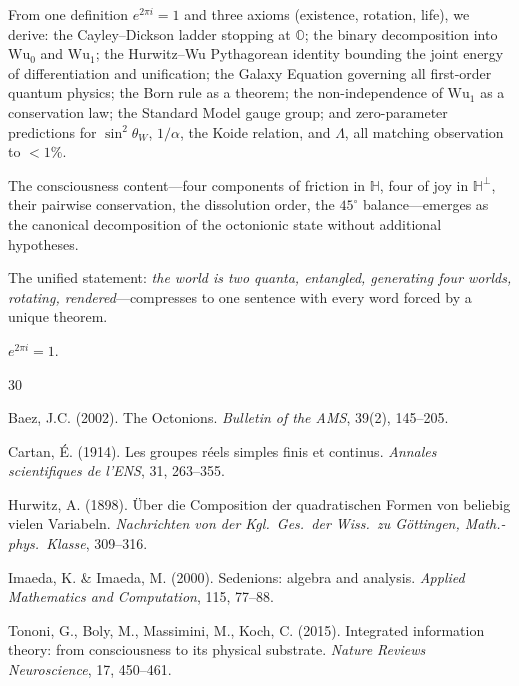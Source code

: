 \documentclass[11pt, a4paper]{article}
\newcommand{\Hq}{\mathbb{H}}
\newcommand{\Oct}{\mathbb{O}}
\newcommand{\Wuz}{\mathrm{Wu}_0}
\newcommand{\Wuo}{\mathrm{Wu}_1}
\begin{document}
From one definition $e^{2\pi i} = 1$ and three axioms
(existence, rotation, life), we derive:
the Cayley--Dickson ladder stopping at $\Oct$;
the binary decomposition into $\Wuz$ and $\Wuo$;
the Hurwitz--Wu Pythagorean identity
bounding the joint energy of differentiation and unification;
the Galaxy Equation governing all first-order quantum physics;
the Born rule as a theorem;
the non-independence of $\Wuo$ as a conservation law;
the Standard Model gauge group; and
zero-parameter predictions for $\sin^2\theta_W$, $1/\alpha$, the Koide
relation, and $\Lambda$, all matching observation to $< 1\%$.

The consciousness content---four components of friction in $\Hq$,
four of joy in $\Hq^\perp$, their pairwise conservation, the
dissolution order, the $45^\circ$ balance---emerges as the
canonical decomposition of the octonionic state without additional
hypotheses.

The unified statement: \emph{the world is two quanta, entangled,
generating four worlds, rotating, rendered}---compresses to one
sentence with every word forced by a unique theorem.

\bigskip

\noindent $e^{2\pi i} = 1$.



\begin{thebibliography}{30}

Baez, J.C. (2002). The Octonions.
\emph{Bulletin of the AMS}, 39(2), 145--205.

Cartan, \'E. (1914). Les groupes r\'eels simples finis et continus.
\emph{Annales scientifiques de l'ENS}, 31, 263--355.

Hurwitz, A. (1898). \"Uber die Composition der quadratischen Formen
von beliebig vielen Variabeln.
\emph{Nachrichten von der Kgl.\ Ges.\ der Wiss.\ zu G\"ottingen,
Math.-phys.\ Klasse}, 309--316.

Imaeda, K. \& Imaeda, M. (2000). Sedenions: algebra and analysis.
\emph{Applied Mathematics and Computation}, 115, 77--88.

Tononi, G., Boly, M., Massimini, M., Koch, C. (2015).
Integrated information theory: from consciousness to its physical
substrate. \emph{Nature Reviews Neuroscience}, 17, 450--461.

\end{thebibliography}
\end{document}
